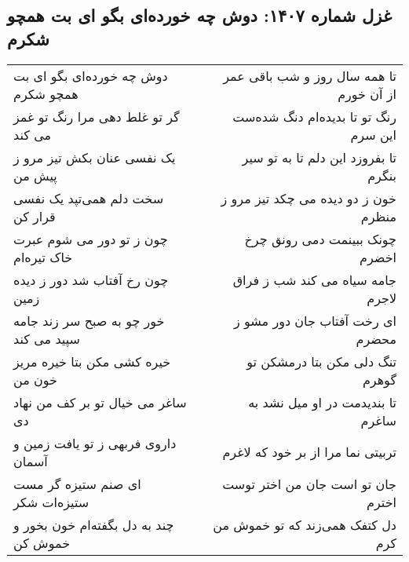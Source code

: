 \begin{center}
\section*{غزل شماره ۱۴۰۷: دوش چه خورده‌ای بگو ای بت همچو شکرم}
\label{sec:1407}
\begin{longtable}{l p{0.5cm} r}
دوش چه خورده‌ای بگو ای بت همچو شکرم
&&
تا همه سال روز و شب باقی عمر از آن خورم
\\
گر تو غلط دهی مرا رنگ تو غمز می کند
&&
رنگ تو تا بدیده‌ام دنگ شده‌ست این سرم
\\
یک نفسی عنان بکش تیز مرو ز پیش من
&&
تا بفروزد این دلم تا به تو سیر بنگرم
\\
سخت دلم همی‌تپد یک نفسی قرار کن
&&
خون ز دو دیده می چکد تیز مرو ز منظرم
\\
چون ز تو دور می شوم عبرت خاک تیره‌ام
&&
چونک ببینمت دمی رونق چرخ اخضرم
\\
چون رخ آفتاب شد دور ز دیده زمین
&&
جامه سیاه می کند شب ز فراق لاجرم
\\
خور چو به صبح سر زند جامه سپید می کند
&&
ای رخت آفتاب جان دور مشو ز محضرم
\\
خیره کشی مکن بتا خیره مریز خون من
&&
تنگ دلی مکن بتا درمشکن تو گوهرم
\\
ساغر می خیال تو بر کف من نهاد دی
&&
تا بندیدمت در او میل نشد به ساغرم
\\
داروی فربهی ز تو یافت زمین و آسمان
&&
تربیتی نما مرا از بر خود که لاغرم
\\
ای صنم ستیزه گر مست ستیزه‌ات شکر
&&
جان تو است جان من اختر توست اخترم
\\
چند به دل بگفته‌ام خون بخور و خموش کن
&&
دل کتفک همی‌زند که تو خموش من کرم
\\
\end{longtable}
\end{center}
